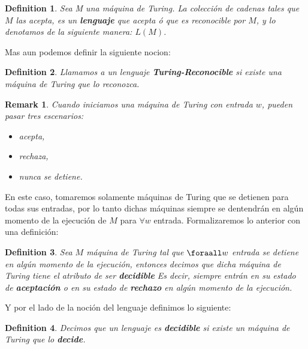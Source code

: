 \documentclass[10pt]{report}
\newtheorem*{remark}{Remark}
\newtheorem{definition}{Definition}
\begin{document}
    \theoremstyle{definition}
    \begin{definition}
        Sea M una máquina de Turing.
        La colección de cadenas tales que $M$ las acepta,
        es un \textbf{lenguaje} que acepta ó que es reconocible por $M$, y lo denotamos
        de la siguiente manera: $L(M)$.
    \end{definition}
    Mas aun podemos definir la siguiente nocion:
    \begin{definition}
        Llamamos a un lenguaje \textbf{Turing-Reconocible} si existe una
        máquina de Turing que lo reconozca.
    \end{definition}
    \begin{remark}
        Cuando iniciamos una máquina de Turing con entrada $w$, pueden pasar tres escenarios:\newline
        \begin{itemize}
            \item acepta,
            \item rechaza,
            \item nunca se detiene.
        \end{itemize}
    \end{remark}
    En este caso, tomaremos solamente máquinas de Turing que se detienen para todas sus entradas,
    por lo tanto dichas máquinas siempre se dentendrán en algún momento de la
    ejecución de $M$ para $\forall w$ entrada.
    Formalizaremos lo anterior con una definición:
    \space
    \begin{definition}
        Sea $M$ máquina de Turing tal que $\foraall w$ entrada se detiene en algún momento de la ejecución,
        entonces decimos que dicha máquina de Turing tiene el atributo de ser
        \textbf{decidible}\newline
        Es decir, siempre entrán en su estado de \textbf{aceptación}
        o en su estado de \textbf{rechazo} en algún momento de la ejecución.
    \end{definition}
    Y por el lado de la noción del lenguaje definimos lo siguiente:
    \begin{definition}
        Decimos que un lenguaje es \textbf{decidible} si existe un máquina de Turing
        que lo \textbf{decide}.
    \end{definition}
\end{document}
